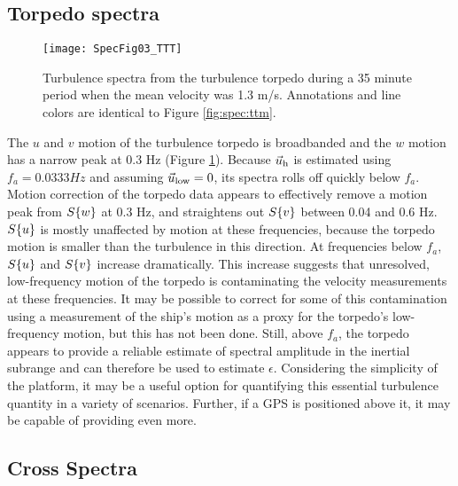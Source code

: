 \subsection{Torpedo spectra}

\begin{figure}[t]
  \centering
  \texttt{[image: SpecFig03\_TTT]}
  \caption{Turbulence spectra from the turbulence torpedo during a 35 minute period when the mean velocity was 1.3 m/s. Annotations and line colors are identical to Figure \ref{fig:spec:ttm}.}
  \label{fig:spec:torpedo}
\end{figure}

The $u$ and $v$ motion of the turbulence torpedo is broadbanded and the $w$ motion has a narrow peak at 0.3 Hz (Figure \ref{fig:spec:torpedo}). Because $\vec{u}_\mathrm{h}$ is estimated using $f_a = 0.0333Hz$ and assuming $\vec{u}_\mathrm{low}=0$, its spectra rolls off quickly below $f_a$.  Motion correction of the torpedo data appears to effectively remove a motion peak from $S\{w\}$ at 0.3 Hz, and straightens out $S\{v\}$ between 0.04 and 0.6 Hz. $S\{u\}$ is mostly unaffected by motion at these frequencies, because the torpedo motion is smaller than the turbulence in this direction. At frequencies below $f_a$, $S\{u\}$ and $S\{v\}$ increase dramatically. This increase suggests that unresolved, low-frequency motion of the torpedo is contaminating the velocity measurements at these frequencies. It may be possible to correct for some of this contamination using a measurement of the ship's motion as a proxy for the torpedo's low-frequency motion, but this has not been done. Still, above $f_a$, the torpedo appears to provide a reliable estimate of spectral amplitude in the inertial subrange and can therefore be used to estimate $\epsilon$. Considering the simplicity of the platform, it may be a useful option for quantifying this essential turbulence quantity in a variety of scenarios. Further, if a GPS is positioned above it, it may be capable of providing even more.


\subsection{Cross Spectra}

